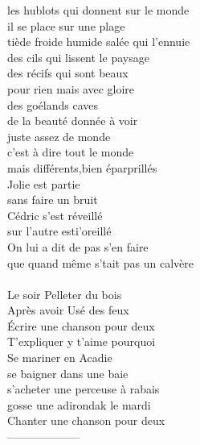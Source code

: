 les hublots qui donnent sur le monde\\
il se place sur une plage\\
tiède froide humide salée qui l'ennuie\\
des cils qui lissent le paysage\\
des récifs qui sont beaux\\
pour rien mais avec gloire\\
des goélands caves\\
de la beauté donnée à voir\\
juste assez de monde\\
c'est à dire tout le monde\\
mais différents,bien éparprillés\\
\clearpage
Jolie est partie \\
sans faire un bruit\\
Cédric s'est réveillé\\
sur l'autre esti'oreillé\\
On lui a dit de pas s'en faire\\
que quand même s'tait pas un calvère\\
\\
Le soir Pelleter du bois\\
Après avoir Usé des feux\\
Écrire une chanson pour deux\\
T'expliquer y t'aime pourquoi\\
Se mariner en Acadie \\
se baigner dans une baie\\
s'acheter une perceuse à rabais\\
gosse une adirondak le mardi\\
Chanter une chanson pour deux\\
\clearpage
--------------------

